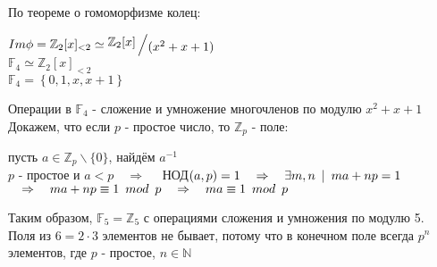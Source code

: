 \documentclass{article}
\newcommand{\bigslant}[2]{{\raisebox{.2em}{$#1$}\left/\raisebox{-.2em}{$#2$}\right.}}
\begin{document}
	По теореме о гомоморфизме колец:
	\begin{center}
		$Im\phi = \mathbb{Z}_2[x]_{<2} \simeq \bigslant{\mathbb{Z}_2[x]}{(x^2 + x + 1)}$  \\
		$\mathbb{F}_4 \simeq \mathbb{Z}_2[x]_{<2}$ \\
		$\mathbb{F}_4 = \left\lbrace 0, 1, x, x+1 \right\rbrace$
	\end{center}
	Операции в $\mathbb{F}_4$ - сложение и умножение многочленов по модулю $x^2+x+1$ \\
	Докажем, что если $p$ - простое число, то $\mathbb{Z}_p$ - поле:
	\begin{center}
		пусть $a \in \mathbb{Z}_p \backslash \lbrace0\rbrace$, найдём $a^{-1}$\\
		$p$ - простое и $a < p \quad\Rightarrow\quad$ НОД$(a, p) = 1 
		\quad\Rightarrow\quad 
		\exists m, n \hspace{5px} | \hspace{5px} ma+np=1$ \\ $
		\quad\Rightarrow\quad 
		 ma+np\equiv1 \hspace{5px}mod\hspace{5px}p 
		 \quad\Rightarrow\quad 
		 ma\equiv1 \hspace{5px}mod\hspace{5px}p 
		$ 
	\end{center}
	Таким образом, $\mathbb{F}_5 = \mathbb{Z}_5$ с операциями сложения и умножения по модулю 5. \\
	
	Поля из $6 = 2\cdot 3$ элементов не бывает, потому что в конечном поле всегда $p^n$ элементов, где $p$ - простое, $n \in \mathbb{N}$
	 
	
\end{document}
